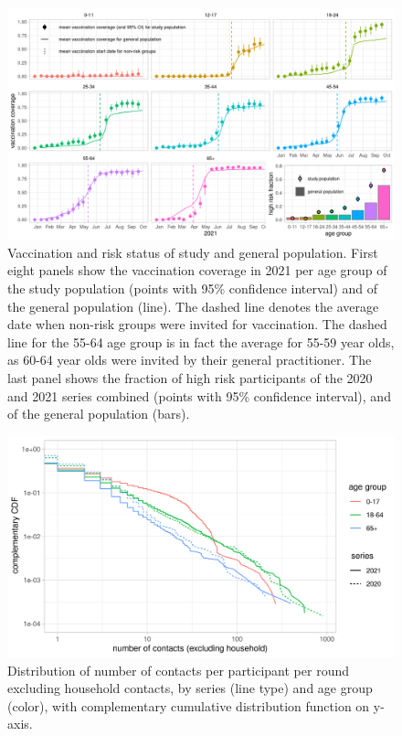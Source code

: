 \documentclass[fleqn,10pt]{wlscirep}
\begin{document}
\clearpage


\begin{figure}[ht]
\centering
\includegraphics[width=\linewidth]{../figures/vaccination_coverage_high_risk.png}
\caption{Vaccination and risk status of study and general population. First eight panels show the vaccination coverage in 2021 per age group of the study population (points with 95\% confidence interval) and of the general population \cite{RIVM_2022} (line). The dashed line denotes the average date when non-risk groups were invited for vaccination. The dashed line for the 55-64 age group is in fact the average for 55-59 year olds, as 60-64 year olds were invited by their general practitioner. The last panel shows the fraction of high risk participants of the 2020 and 2021 series combined (points with 95\% confidence interval), and of the general population \cite{Nivel_2021} (bars).}
\label{fig:vacc_risk}
\end{figure}

\clearpage


\begin{figure}[ht]
\centering
\includegraphics[width=\linewidth]{../figures/powerlaw_contacts.png}
\caption{Distribution of number of contacts per participant per round excluding household contacts, by series (line type) and age group (color), with complementary cumulative distribution function on y-axis.}
\label{fig:powerlaw}
\end{figure}
\end{document}
